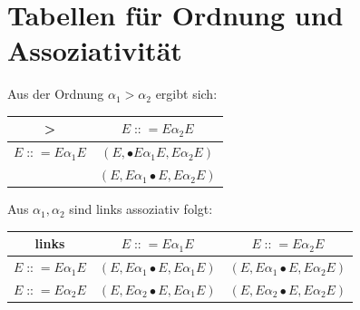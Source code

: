 \documentclass[t]{beamer}
\renewcommand{\Coloneqq}{\mathrel{\mathop{::}}=}
\begin{document}
    \section{Tabellen für Ordnung und Assoziativität}\label{sec:tabellen-fur-ordnung-und-assotiativitat}
    \begin{frame}
        \begin{block}{Aus der Ordnung $ \alpha_{1} > \alpha_{2}$ ergibt sich:}
            \begin{table}[h]
                \centering
                \begin{tabular}{|c|c|}
                    \hline
                    >                          & $E \Coloneqq E\alpha_{2}E$                   \\
                    \hline
                    $E \Coloneqq E\alpha_{1}E$ & $(E, \bullet{E}\alpha_{1}E, {E}\alpha_{2}E)$ \\
                    & $(E, E\alpha_{1}\bullet{E}, E\alpha_{2}E)$   \\
                    \hline
                \end{tabular}\label{tab:table}
            \end{table}\cite{softwarelanguage}
        \end{block}
        \bigskip\bigskip
        \begin{block}{Aus $\alpha_{1}, \alpha_{2}$ sind links assoziativ folgt:}
            \begin{table}[h]
                \centering
                \begin{tabular}{|c|c|c|}
                    \hline
                    links                      & $E \Coloneqq E\alpha_{1}E$                 & $E \Coloneqq E\alpha_{2}E$                 \\
                    \hline
                    $E \Coloneqq E\alpha_{1}E$ & $(E, E\alpha_{1}\bullet{E}, E\alpha_{1}E)$ & $(E, E\alpha_{1}\bullet{E}, E\alpha_{2}E)$ \\
                    \hline
                    $E \Coloneqq E\alpha_{2}E$ & $(E, E\alpha_{2}\bullet{E}, E\alpha_{1}E)$ & $(E, E\alpha_{2}\bullet{E}, E\alpha_{2}E)$ \\
                    \hline
                \end{tabular}\label{tab:table2}
            \end{table}\cite{softwarelanguage}
        \end{block}
    \end{frame}
\end{document}
